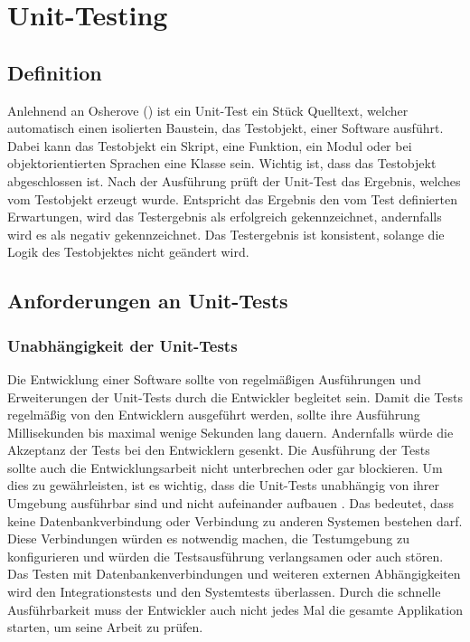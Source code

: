 \section{Unit-Testing}
\subsection{Definition}
Anlehnend an Osherove (\autocite[S. 34]{Osherove2015}) ist ein Unit-Test ein Stück Quelltext, welcher automatisch einen isolierten Baustein, das Testobjekt, einer Software ausführt. Dabei kann das Testobjekt ein Skript, eine Funktion, ein Modul oder bei objektorientierten Sprachen eine Klasse sein. Wichtig ist, dass das Testobjekt abgeschlossen ist. Nach der Ausführung prüft der Unit-Test das Ergebnis, welches vom Testobjekt erzeugt wurde. Entspricht das Ergebnis den vom Test definierten Erwartungen, wird das Testergebnis als erfolgreich gekennzeichnet, andernfalls wird es als negativ gekennzeichnet.
Das Testergebnis ist konsistent, solange die Logik des Testobjektes nicht geändert wird.

\subsection{Anforderungen an Unit-Tests}
\subsubsection*{Unabhängigkeit der Unit-Tests}
Die Entwicklung einer Software sollte von regelmäßigen Ausführungen und Erweiterungen der Unit-Tests durch die Entwickler begleitet sein. Damit die Tests regelmäßig von den Entwicklern ausgeführt werden, sollte ihre Ausführung Millisekunden bis maximal wenige Sekunden lang dauern. Andernfalls würde die Akzeptanz der Tests bei den Entwicklern gesenkt. Die Ausführung der Tests sollte auch die Entwicklungsarbeit nicht unterbrechen oder gar blockieren. Um dies zu gewährleisten, ist es wichtig, dass die Unit-Tests unabhängig von ihrer Umgebung ausführbar sind und nicht aufeinander aufbauen \autocite[vgl.][S. 19]{Springer2015}. Das bedeutet, dass keine Datenbankverbindung oder Verbindung zu anderen Systemen bestehen darf. Diese Verbindungen würden es notwendig machen, die Testumgebung zu konfigurieren und würden die Testsausführung verlangsamen oder auch stören. Das Testen mit Datenbankenverbindungen und weiteren externen Abhängigkeiten wird den Integrationstests und den Systemtests überlassen.
Durch die schnelle Ausführbarkeit muss der Entwickler auch nicht jedes Mal die gesamte Applikation starten, um seine Arbeit zu prüfen.
